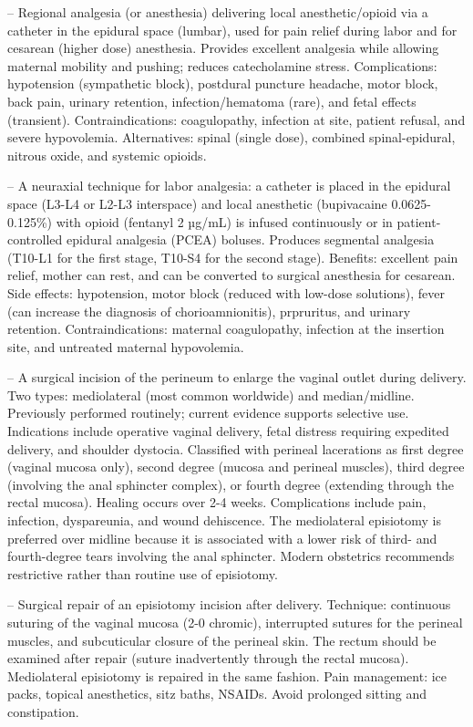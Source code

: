 -- Regional analgesia (or anesthesia) delivering local anesthetic/opioid via a catheter in the epidural space (lumbar), used for pain relief during labor and for cesarean (higher dose) anesthesia. Provides excellent analgesia while allowing maternal mobility and pushing; reduces catecholamine stress. Complications: hypotension (sympathetic block), postdural puncture headache, motor block, back pain, urinary retention, infection/hematoma (rare), and fetal effects (transient). Contraindications: coagulopathy, infection at site, patient refusal, and severe hypovolemia. Alternatives: spinal (single dose), combined spinal-epidural, nitrous oxide, and systemic opioids.

-- A neuraxial technique for labor analgesia: a catheter is placed in the epidural space (L3-L4 or L2-L3 interspace) and local anesthetic (bupivacaine 0.0625-0.125\%) with opioid (fentanyl 2 µg/mL) is infused continuously or in patient-controlled epidural analgesia (PCEA) boluses. Produces segmental analgesia (T10-L1 for the first stage, T10-S4 for the second stage). Benefits: excellent pain relief, mother can rest, and can be converted to surgical anesthesia for cesarean. Side effects: hypotension, motor block (reduced with low-dose solutions), fever (can increase the diagnosis of chorioamnionitis), prpruritus, and urinary retention. Contraindications: maternal coagulopathy, infection at the insertion site, and untreated maternal hypovolemia.

-- A surgical incision of the perineum to enlarge the vaginal outlet during delivery. Two types: mediolateral (most common worldwide) and median/midline. Previously performed routinely; current evidence supports selective use. Indications include operative vaginal delivery, fetal distress requiring expedited delivery, and shoulder dystocia. Classified with perineal lacerations as first degree (vaginal mucosa only), second degree (mucosa and perineal muscles), third degree (involving the anal sphincter complex), or fourth degree (extending through the rectal mucosa). Healing occurs over 2-4 weeks. Complications include pain, infection, dyspareunia, and wound dehiscence. The mediolateral episiotomy is preferred over midline because it is associated with a lower risk of third- and fourth-degree tears involving the anal sphincter. Modern obstetrics recommends restrictive rather than routine use of episiotomy.

-- Surgical repair of an episiotomy incision after delivery. Technique: continuous suturing of the vaginal mucosa (2-0 chromic), interrupted sutures for the perineal muscles, and subcuticular closure of the perineal skin. The rectum should be examined after repair (suture inadvertently through the rectal mucosa). Mediolateral episiotomy is repaired in the same fashion. Pain management: ice packs, topical anesthetics, sitz baths, NSAIDs. Avoid prolonged sitting and constipation.

